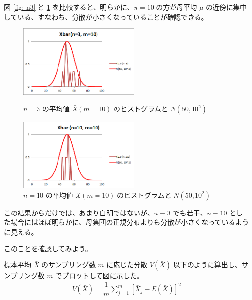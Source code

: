\documentclass[uplatex,11pt,a4paper]{jsarticle}
\begin{document}
図 \ref{fig: n3} と \ref{fig: n10} を比較すると、明らかに、$n=10$ の方が母平均 $\mu$ の近傍に集中している、すなわち、分散が小さくなっていることが確認できる。
\begin{figure}[htb]
\begin{minipage}{0.5\hsize}
 \centering
	\includegraphics[width=6cm]{./figs/Xbar_n3M10.png}
	\caption{$n=3$ の平均値 $\bar{X} (m=10) $ のヒストグラムと $N(50, 10^2)$ }
	\label{fig: n3}
\end{minipage}
\begin{minipage}{0.5\hsize}
 \centering
	\includegraphics[width=6cm]{./figs/Xbar_n10M10.png}
	\caption{$n=10$ の平均値 $\bar{X} (m=10) $ のヒストグラムと $N(50, 10^2)$ }
	\label{fig: n10}
\end{minipage}
\end{figure}

この結果からだけでは、あまり自明ではないが、$n=3$ でも若干、$n=10$ とした場合にはほぼ明らかに、母集団の正規分布よりも分散が小さくなっているように見える。

このことを確認してみよう。

標本平均 $\bar{X}$ のサンプリング数 $m$ に応じた分散 $V(\bar{X})$ 以下のように算出し、サンプリング数 $m$ でプロットして図に示した。
\begin{align*}
V(\bar{X}) = \dfrac{1}{m} \sum_{j=1}^m [\bar{X}_j - E(\bar{X})]^2
\end{align*}
\end{document}
